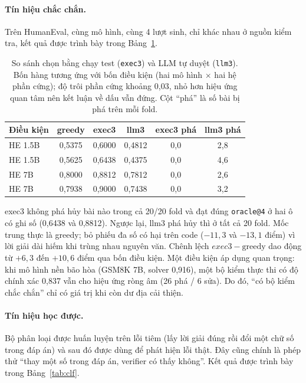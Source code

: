 \documentclass[12pt,a4paper]{article}
\begin{document}
\paragraph{Tín hiệu chắc chắn.}
Trên HumanEval, cùng mô hình, cùng 4 lượt sinh, chỉ khác nhau ở nguồn kiểm tra, kết quả được trình bày trong Bảng~\ref{tab:exec}.

\begin{table}[htbp]
\centering
\small
\begin{tabular}{@{}l c c c c c@{}}
\toprule
Điều kiện & greedy & exec3 & llm3 & exec3 phá & llm3 phá\\
\midrule
HE 1.5B  & 0,5375 & 0,6000 & 0,4812 & 0,0 & 2,8\\
HE 1.5B    & 0,5625 & 0,6438 & 0,4375 & 0,0 & 4,6\\
HE 7B      & 0,8000 & 0,8812 & 0,7812 & 0,0 & 2,6\\
HE 7B   & 0,7938 & 0,9000 & 0,7438 & 0,0 & 3,2\\
\bottomrule
\end{tabular}
\caption{So sánh chọn bằng chạy test (\texttt{exec3}) và LLM tự duyệt (\texttt{llm3}). Bốn hàng tương ứng với bốn điều kiện (hai mô hình \(\times\) hai hệ phần cứng); độ trôi phần cứng khoảng 0,03, nhỏ hơn hiệu ứng quan tâm nên kết luận về dấu vẫn đứng. Cột “phá” là số bài bị phá trên mỗi fold. }
\label{tab:exec}
\end{table}

exec3 không phá hủy bài nào trong cả 20/20 fold và đạt đúng \texttt{oracle@4} ở hai ô có ghi số (0,6438 và 0,8812). Ngược lại, llm3 phá hủy thì ở tất cả 20 fold. Mốc trung thực là greedy; bỏ phiếu đa số có hại trên code (\(-11{,}3\) và \(-13{,}1\) điểm) vì lời giải dài hiếm khi trùng nhau nguyên văn. Chênh lệch \(exec3-\text{greedy}\) dao động từ \(+6{,}3\) đến \(+10{,}6\) điểm qua bốn điều kiện. Một điều kiện áp dụng quan trọng: khi mô hình nền bão hòa (GSM8K 7B, solver 0,916), một bộ kiểm thực thi có độ chính xác 0,837 vẫn cho hiệu ứng ròng âm (26 phá / 6 sửa). Do đó, “có bộ kiểm chắc chắn” chỉ có giá trị khi còn dư địa cải thiện.

\paragraph{Tín hiệu học được.}
Bộ phân loại được huấn luyện trên lỗi tiêm (lấy lời giải đúng rồi đổi một chữ số trong đáp án) và sau đó được dùng để phát hiện lỗi thật. Đây cũng chính là phép thử “thay một số trong đáp án, verifier có thấy không”. Kết quả được trình bày trong Bảng~\ref{tab:clf}.
\end{document}
